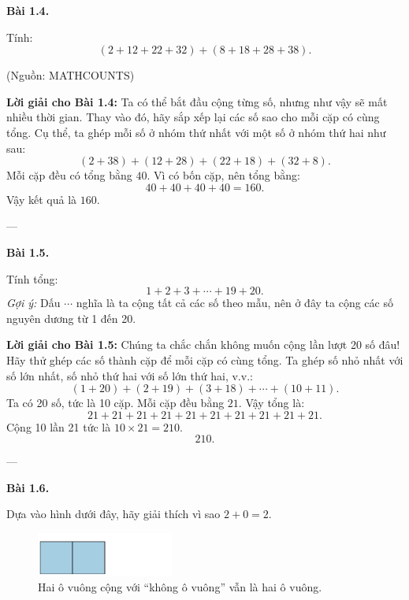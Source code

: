 \documentclass[14pt,a4paper]{extbook}
\newenvironment{problem}[1][]{
  \par\noindent\textbf{Bài #1.}\ \ignorespaces
}{\par}
\begin{document}
\begin{problem}[1.4]
Tính:
\[
(2 + 12 + 22 + 32) + (8 + 18 + 28 + 38).
\]
\begin{flushright}\small(Nguồn: MATHCOUNTS)\end{flushright}
\end{problem}

\noindent\textbf{Lời giải cho Bài 1.4:}  
Ta có thể bắt đầu cộng từng số, nhưng như vậy sẽ mất nhiều thời gian.  
Thay vào đó, hãy sắp xếp lại các số sao cho mỗi cặp có cùng tổng.  
Cụ thể, ta ghép mỗi số ở nhóm thứ nhất với một số ở nhóm thứ hai như sau:
\[
(2 + 38) + (12 + 28) + (22 + 18) + (32 + 8).
\]
Mỗi cặp đều có tổng bằng \(40\).  
Vì có bốn cặp, nên tổng bằng:
\[
40 + 40 + 40 + 40 = 160.
\]
Vậy kết quả là \(\boxed{160}.\)
\medskip

---

\begin{problem}[1.5]
Tính tổng:
\[
1 + 2 + 3 + \cdots + 19 + 20.
\]
\textit{Gợi ý:} Dấu \texttt{$\cdots$} nghĩa là ta cộng tất cả các số theo mẫu,  
nên ở đây ta cộng các số nguyên dương từ 1 đến 20.
\end{problem}

\noindent\textbf{Lời giải cho Bài 1.5:}  
Chúng ta chắc chắn không muốn cộng lần lượt 20 số đâu!  
Hãy thử ghép các số thành cặp để mỗi cặp có cùng tổng.  
Ta ghép số nhỏ nhất với số lớn nhất, số nhỏ thứ hai với số lớn thứ hai, v.v.:
\[
(1 + 20) + (2 + 19) + (3 + 18) + \cdots + (10 + 11).
\]
Ta có 20 số, tức là 10 cặp.  
Mỗi cặp đều bằng \(21\).  
Vậy tổng là:
\[
21 + 21 + 21 + 21 + 21 + 21 + 21 + 21 + 21 + 21.
\]
Cộng 10 lần 21 tức là \(10 \times 21 = 210.\)
\[
\boxed{210}.
\]

---

\begin{problem}[1.6]
Dựa vào hình dưới đây, hãy giải thích vì sao \(2 + 0 = 2.\)

\begin{figure}[ht!]
  \centering
  \includegraphics[width=0.4\textwidth]{img/fig-prob1.6.pdf}
  \caption*{\small Hai ô vuông cộng với “không ô vuông” vẫn là hai ô vuông.}
\end{figure}
\end{problem}
\end{document}
